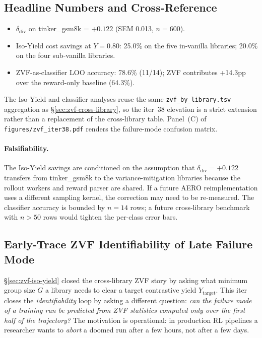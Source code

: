 \documentclass{article}
\begin{document}
\subsection{Headline Numbers and Cross-Reference}
\label{sec:zvf-iter38-headline}
\begin{itemize}
\item $\delta_{\mathrm{div}}$ on tinker\_gsm8k = $+0.122$ (SEM 0.013,
      $n{=}600$).
\item Iso-Yield cost savings at $Y{=}0.80$: 25.0\% on the five
      in-vanilla libraries; 20.0\% on the four sub-vanilla libraries.
\item ZVF-as-classifier LOO accuracy: 78.6\% (11/14); ZVF contributes
      +14.3pp over the reward-only baseline (64.3\%).
\end{itemize}
The Iso-Yield and classifier analyses reuse the same
\texttt{zvf_by_library.tsv} aggregation as
\S\ref{sec:zvf-cross-library}, so the iter~38 elevation is a strict
extension rather than a replacement of the cross-library table.
Panel~(C) of \texttt{figures/zvf_iter38.pdf} renders the failure-mode
confusion matrix.

\paragraph{Falsifiability.}
The Iso-Yield savings are conditioned on the assumption that
$\delta_{\mathrm{div}}{=}+0.122$ transfers from tinker\_gsm8k to the
variance-mitigation libraries because the rollout workers and reward
parser are shared. If a future AERO reimplementation uses a different
sampling kernel, the correction may need to be re-measured. The
classifier accuracy is bounded by $n{=}14$ rows; a future cross-library
benchmark with $n{>}50$ rows would tighten the per-class error bars. 

\subsection{Early-Trace ZVF Identifiability of Late Failure Mode}
\label{sec:zvf-early-identify}
\S\ref{sec:zvf-iso-yield} closed the cross-library ZVF story by
asking what minimum group size $G$ a library needs to clear a target
contrastive yield $Y_{\mathrm{target}}$. This iter closes the
\emph{identifiability} loop by asking a different question: \emph{can
the failure mode of a training run be predicted from ZVF statistics
computed only over the first half of the trajectory?} The motivation
is operational: in production RL pipelines a researcher wants to
\emph{abort} a doomed run after a few hours, not after a few days.
\end{document}
